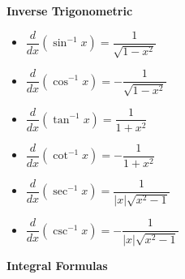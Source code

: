\documentclass[12pt]{article}
\begin{document}
\begin{multicols}{2}
\textbf{Inverse Trigonometric}
\begin{itemize}
  \item $\dfrac{d}{dx}(\sin^{-1}x) = \dfrac{1}{\sqrt{1 - x^2}}$
  \item $\dfrac{d}{dx}(\cos^{-1}x) = -\dfrac{1}{\sqrt{1 - x^2}}$
  \item $\dfrac{d}{dx}(\tan^{-1}x) = \dfrac{1}{1 + x^2}$
  \item $\dfrac{d}{dx}(\cot^{-1}x) = -\dfrac{1}{1 + x^2}$
  \item $\dfrac{d}{dx}(\sec^{-1}x) = \dfrac{1}{|x|\sqrt{x^2 - 1}}$
  \item $\dfrac{d}{dx}(\csc^{-1}x) = -\dfrac{1}{|x|\sqrt{x^2 - 1}}$
\end{itemize}

\end{multicols}

\newpage

\begin{center}
    {\LARGE \textbf{Integral Formulas}}
\end{center}
\end{document}
